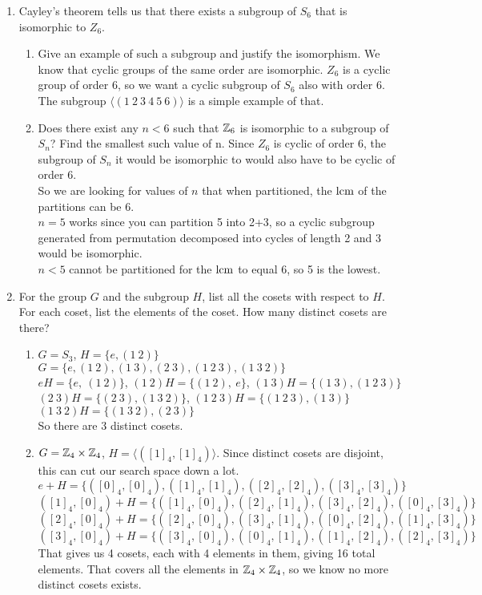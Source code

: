 \documentclass[12pt]{article}
\begin{document}
\begin{enumerate}
		\item Cayley's theorem tells us that there exists a subgroup of $S_6$ that is isomorphic to $Z_6$.
		\begin{enumerate}
			\item  Give an example of such a subgroup and justify the isomorphism.\m
			We know that cyclic groups of the same order are isomorphic. $Z_6$ is a cyclic group of order 6, so we want a cyclic subgroup of $S_6$ also with order 6. The subgroup $\langle(1\ 2\ 3\ 4\ 5\ 6)\rangle$ is a simple example of that.
			
			\item  Does there exist any $n < 6$ such that $\mathbb{Z}_6$ is isomorphic to a subgroup of $S_n$? Find the smallest such value of n.\m
			Since $Z_6$ is cyclic of order 6, the subgroup of $S_n$ it would be isomorphic to would also have to be cyclic of order 6.\\
			So we are looking for values of $n$ that when partitioned, the $\operatorname{lcm}$ of the partitions can be 6.\\
			$n = 5$ works since you can partition 5 into 2+3, so a cyclic subgroup generated from permutation decomposed into cycles of length 2 and 3 would be isomorphic.\\
			$n<5$ cannot be partitioned for the $\operatorname{lcm}$ to equal 6, so 5 is the lowest.
		\end{enumerate}
	
		\item For the group $G$ and the subgroup $H$, list all the cosets with respect to $H$. For each coset, list the elements of the coset. How many distinct cosets are there?
		\begin{enumerate}
			\item $G = S_3$, $H = \{e,(1\ 2)\}$\m
			$G = \{e, (1\ 2), (1\ 3), (2\ 3), (1\ 2\ 3), (1\ 3\ 2)\}$\\
			$eH = \{e,\ (1\ 2)\}$, \quad $(1\ 2)H =\{(1\ 2),\ e\}$, \quad $(1\ 3)H = \{(1\ 3), (1\ 2\ 3)\}$\\ 
			$(2\ 3)H = \{(2\ 3),(1\ 3\ 2)\}$, \quad $(1\ 2\ 3)H = \{(1\ 2\ 3), (1\ 3)\}$\\
			$(1\ 3\ 2)H = \{(1\ 3\ 2), (2\ 3)\}$\\
			So there are 3 distinct cosets.
			\item $G = \mathbb{Z}_4\times\mathbb{Z}_4$, $H=\langle([1]_4,[1]_4)\rangle$.\m
			Since distinct cosets are disjoint, this can cut our search space down a lot.\\
			$e+H = \{([0]_4,[0]_4),([1]_4,[1]_4),([2]_4,[2]_4),([3]_4,[3]_4)\}$\\
			$([1]_4,[0]_4)+H = \{([1]_4,[0]_4),([2]_4,[1]_4),([3]_4,[2]_4),([0]_4,[3]_4)\}$\\
			$([2]_4,[0]_4)+H = \{([2]_4,[0]_4),([3]_4,[1]_4),([0]_4,[2]_4),([1]_4,[3]_4)\}$\\
			$([3]_4,[0]_4)+H = \{([3]_4,[0]_4),([0]_4,[1]_4),([1]_4,[2]_4),([2]_4,[3]_4)\}$\\
			That gives us 4 cosets, each with 4 elements in them, giving 16 total elements. That covers all the elements in $\mathbb{Z}_4\times\mathbb{Z}_4$, so we know no more distinct cosets exists.
		\end{enumerate}
	

\end{enumerate}
\end{document}
